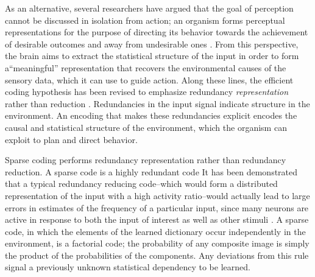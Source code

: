 As an alternative, several researchers have argued that the goal of perception cannot be discussed in isolation from action; an organism forms perceptual representations for the purpose of directing its behavior towards the achievement of desirable outcomes and away from undesirable ones \cite{barlow2001redundancy, simoncelli2001natural}. From this perspective, the brain aims to extract the statistical structure of the input in order to form a``meaningful'' representation that recovers the environmental causes of the sensory data, which it can use to guide action. Along these lines, the efficient coding hypothesis has been revised to emphasize redundancy \textit{representation} rather than reduction \cite{barlow2001redundancy}. Redundancies in the input signal indicate structure in the environment. An encoding that makes these redundancies explicit encodes the causal and statistical structure of the environment, which the organism can exploit to plan and direct behavior.

Sparse coding performs redundancy representation rather than redundancy reduction. A sparse code is a highly redundant code It has been demonstrated that a typical redundancy reducing code--which would form a distributed representation of the input with a high activity ratio--would actually lead to large errors in estimates of the frequency of a particular input, since many neurons are active in response to both the input of interest as well as other stimuli \cite{gardnermedwin2001limits}. A sparse code, in which the elements of the learned dictionary occur independently in the environment, is a factorial code; the probability of any composite image is simply the product of the probabilities of the components. Any deviations from this rule signal a previously unknown statistical dependency to be learned.

